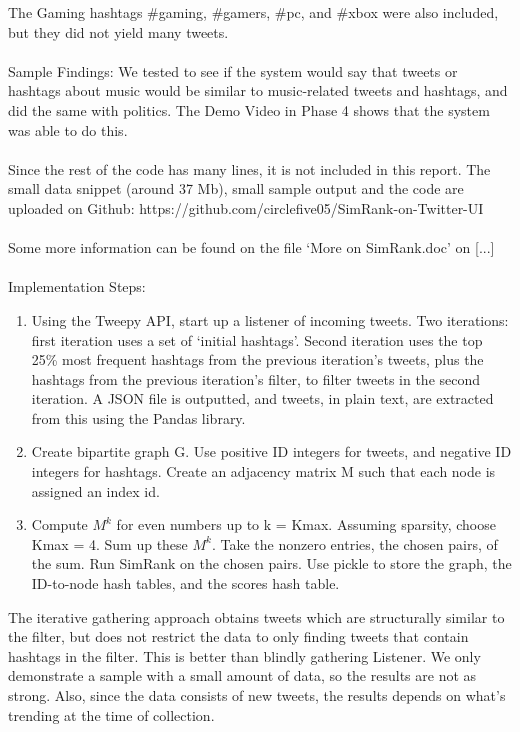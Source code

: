 \documentclass[10pt]{article}
\begin{document}
The Gaming hashtags \#gaming, \#gamers, \#pc, and \#xbox were also included, but they did not yield many tweets.
\\\\
Sample Findings: We tested to see if the system would say that tweets or hashtags about music would be similar to music-related tweets and hashtags, and did the same with politics. The Demo Video in Phase 4 shows that the system was able to do this.
\\\\
Since the rest of the code has many lines, it is not included in this report. The small data snippet (around 37 Mb), small sample output and the code are uploaded on Github: 
https://github.com/circlefive05/SimRank-on-Twitter-UI
\\\\
Some more information can be found on the file ‘More on SimRank.doc’ on [...]
\\\\
Implementation Steps:
\begin{enumerate}
	\item Using the Tweepy API, start up a listener of incoming tweets. Two iterations: first iteration uses a set of ‘initial hashtags’. Second iteration uses the top 25\% most frequent hashtags from the previous iteration’s tweets, plus the hashtags from the previous iteration’s filter, to filter tweets in the second iteration. A JSON file is outputted, and tweets, in plain text, are extracted from this using the Pandas library.
\item Create bipartite graph G. Use positive ID integers for tweets, and negative ID integers for hashtags. Create an adjacency matrix M such that each node is assigned an index id.
\item Compute $M^k$ for even numbers up to k = Kmax. Assuming sparsity, choose Kmax = 4. Sum up these $M^k$. Take the nonzero entries, the chosen pairs, of the sum. Run SimRank on the chosen pairs. Use pickle to store the graph, the ID-to-node hash tables, and the scores hash table. 
\end{enumerate}	
The iterative gathering approach obtains tweets which are structurally similar to the filter, but does not restrict the data to only finding tweets that contain hashtags in the filter. This is better than blindly gathering Listener. We only demonstrate a sample with a small amount of data, so the results are not as strong. Also, since the data consists of new tweets, the results depends on what’s trending at the time of collection.

%
\end{document}
